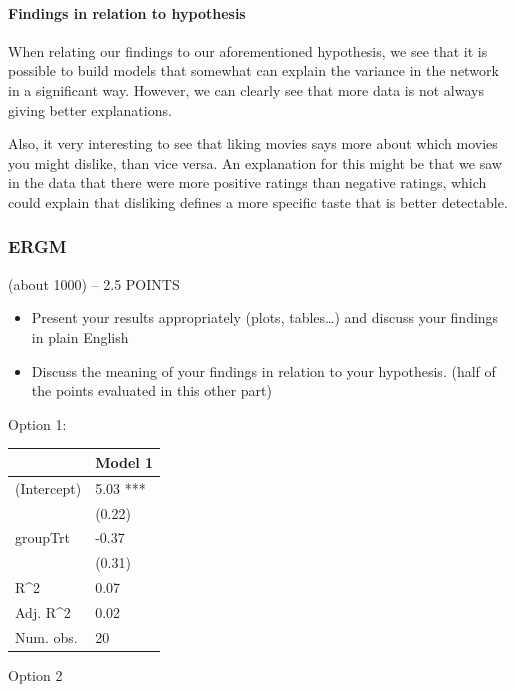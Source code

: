 \documentclass[
  man]{apa6}
\begin{document}
\hypertarget{findings-in-relation-to-hypothesis}{%
\paragraph{Findings in relation to
hypothesis}\label{findings-in-relation-to-hypothesis}}

When relating our findings to our aforementioned hypothesis, we see that
it is possible to build models that somewhat can explain the variance in
the network in a significant way. However, we can clearly see that more
data is not always giving better explanations.

Also, it very interesting to see that liking movies says more about
which movies you might dislike, than vice versa. An explanation for this
might be that we saw in the data that there were more positive ratings
than negative ratings, which could explain that disliking defines a more
specific taste that is better detectable.

\hypertarget{ergm-1}{%
\subsubsection{ERGM}\label{ergm-1}}

(about 1000) -- 2.5 POINTS

\begin{itemize}
\item
  Present your results appropriately (plots, tables\ldots) and discuss
  your findings in plain English
\item
  Discuss the meaning of your findings in relation to your hypothesis.
  (half of the points evaluated in this other part)
\end{itemize}

Option 1:

\begin{tabular}{l|l}
\hline
 & Model 1\\
\hline
(Intercept) & 5.03 ***\\
\hline
 & (0.22)\\
\hline
groupTrt & -0.37\\
\hline
 & (0.31)\\
\hline
R\textasciicircum{}2 & 0.07\\
\hline
Adj. R\textasciicircum{}2 & 0.02\\
\hline
Num. obs. & 20\\
\hline
\end{tabular}

Option 2
\end{document}
